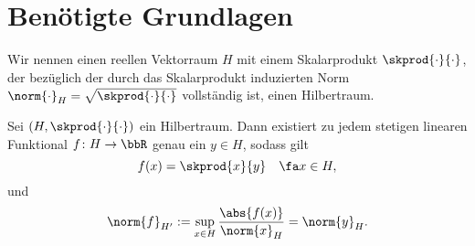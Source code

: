 
\section{Benötigte Grundlagen} %
\label{sec:benoetigte_grundlagen}

\begin{Definition}[Hilbertraum]
    \label{def:hilbertraum}
    Wir nennen einen reellen Vektorraum $H$ mit einem Skalarprodukt $\skprod{\cdot}{\cdot}$, der bezüglich der durch das Skalarprodukt induzierten Norm $\norm{\cdot}_H = \sqrt{\skprod{\cdot}{\cdot}}$ vollständig ist, einen Hilbertraum.
\end{Definition}


\begin{Satz}
    \label{satz:rieszscher_darstellungssatz}
    Sei $(H, \skprod{\cdot}{\cdot})$ ein Hilbertraum. Dann existiert zu jedem stetigen linearen Funktional $f \colon H \to \bbR$ genau ein $y \in H$, sodass gilt
    \begin{equation}
        f(x) = \skprod{x}{y} \quad \fa x \in H,
    \end{equation}
    und
    \begin{equation}
         \norm{f}_{H'} := \sup_{x \in H} \frac{\abs{f(x)}}{\norm{x}_H} = \norm{y}_H.
    \end{equation}
\end{Satz}




